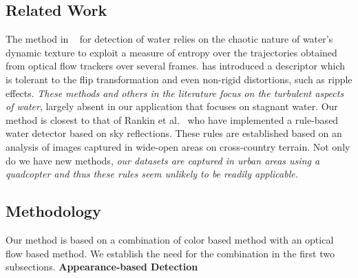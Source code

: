 \documentclass[11pt]{article}
\begin{document}
\subsection{Related Work}
The method in ~\cite{santana12} for detection of
water relies on the chaotic nature of water's dynamic texture to
exploit a measure of entropy over the trajectories obtained from
optical flow trackers over several frames. \cite{zhang10} has
introduced a descriptor which is tolerant to the flip transformation
and even non-rigid distortions, such as ripple effects.  \emph{These
  methods and others in the literature focus on the turbulent aspects
  of water}, largely absent in our application that focuses on
stagnant water.  Our method is closest to that of Rankin et
al.~\cite{rankin2004daytime, rankin11} who have implemented a rule-based water
detector based on sky reflections.  These rules are established
based on an analysis of images captured in wide-open areas on
cross-country terrain. Not only do we have new methods, \emph{our
datasets are captured in urban areas using a quadcopter and thus these
rules seem unlikely to be readily applicable.}

\subsection{Methodology}
Our method is based on a combination of color based method with an optical flow
based method.  We establish the need for the combination in the first two subsections.
\vspace{0.5cm}
\noindent\textbf{Appearance-based Detection}
\end{document}
